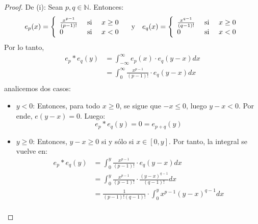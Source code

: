 \documentclass[12pt]{report}
\newcounter{it}
\theoremstyle{largebreak}
\begin{document}
    \begin{proof}
        De (i): Sean $p,q\in\mathbb{N}$. Entonces:
        \begin{equation*}
            e_p(x)=\left\{
                    \begin{array}{lcr}
                        \frac{x^{p-1}}{(p-1)!} & \textup{ si } & x\geq 0 \\
                        0 & \textup{ si }&x<0\\
                    \end{array}
                \right.
            \quad\textup{y}\quad
            e_q(x)=\left\{
                    \begin{array}{lcr}
                        \frac{x^{q-1}}{(q-1)!} & \textup{ si } & x\geq 0 \\
                        0 & \textup{ si }&x<0\\
                    \end{array}
                \right.
        \end{equation*}
        Por lo tanto,
        \begin{equation*}
            \begin{split}
                e_p*e_q(y)&=\int_{-\infty}^\infty e_p(x)\cdot e_q(y-x)dx\\
                &=\int_{0}^\infty\frac{x^{p-1}}{(p-1)!}\cdot e_q(y-x)dx\\ 
            \end{split}
        \end{equation*}
        analicemos dos casos:
        \begin{itemize}
            \item $y<0$: Entonces, para todo $x\geq 0$, se sigue que $-x\leq 0$, luego $y-x<0$. Por ende, $e(y-x)=0$. Luego:
            \begin{equation*}
                e_p*e_q(y)=0=e_{p+q}(y)
            \end{equation*}
            \item $y\geq 0$: Entonces, $y-x\geq 0$ si y sólo si $x\in[0,y]$. Por tanto, la integral se vuelve en:
            \begin{equation*}
                \begin{split}
                    e_p*e_q(y)&=\int_{0}^y\frac{x^{p-1}}{(p-1)!}\cdot e_q(y-x)dx\\
                    &=\int_{0}^y\frac{x^{p-1}}{(p-1)!}\cdot\frac{(y-x)^{q-1}}{(q-1)!}dx\\
                    &=\frac{1}{(p-1)!(q-1)!}\cdot\int_{0}^y x^{p-1}(y-x)^{q-1}dx\\

\end{split}
\end{equation*}
\end{itemize}
\end{proof}
\end{document}
